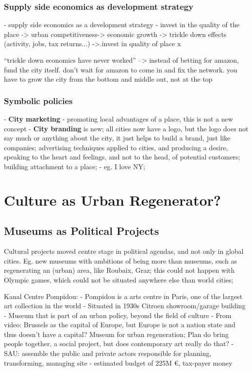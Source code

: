 \documentclass{article}
\begin{document}
\subsubsection{Supply side economics as development  strategy}

	- supply side economics as a development strategy
		- invest in the quality of the place -> urban competitiveness-> economic growth -> trickle down effects (activity, jobs, tax returns...) ->.invest in quality of place x

``trickle down economics have never worked'' --> instead of betting for amazon, fund the city itself. don't wait for amazon to come in and fix the network. you have to grow the city from the bottom and middle out, not at the top

\subsubsection{Symbolic policies}

- \textbf{City marketing} - promoting local advantages of a place, this is not a new concept
- \textbf{City branding} is new; all cities now have a logo, but the logo does not say much or anything about the city, it just helps to build a brand, just like companies; advertising techniques applied to cities, and producing a desire, speaking to the heart and feelings, and not to the head, of potential customers; building attachment to a place;
	- eg. I love NY; 



\section{Culture as Urban Regenerator?}


\subsection{Museums as Political Projects}

Cultural projects moved centre stage in political agendas, and not only in global cities.
Eg. new museums with ambitions of being more than museums, such as regenerating an (urban) area, like Roubaix, Graz; this could not happen with Olympic games, which could not be situated anywhere else than world cities;

Kanal Centre Pompidou:
- Pompidou is a arts centre in Paris, one of the largest art collection in the world
- Situated in 1930s  Citroen showroom/garage building
- Museum that is part of an urban policy, beyond the field of culture
- From video: Brussels as the capital of Europe, but Europe is not a nation state and thus doesn't have a capital? Museum for urban regeneration; Plan do bring people together, a social project, but does contemporary art really do that?
- SAU: assemble the public and private actors responsible for planning, transforming, managing site
- estimated budget of 225M €, tax-payer money
\end{document}
